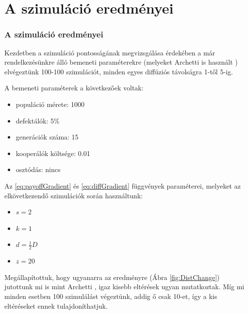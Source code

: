 \section{A szimuláció eredményei}
\begin{frame}
\frametitle{A szimuláció eredményei}
Kezdetben a szimuláció pontosságának megvizsgálása érdekében a már rendelkezésünkre álló bemeneti paraméterekre (melyeket Archetti is használt \cite{archetti2016cooperation}) elvégeztünk 100-100 szimulációt, minden egyes diffúziós távolságra 1-től 5-ig.

\begin{multicols}{2}
	A bemeneti paraméterek a következőek voltak:
	\begin{itemize}
		\item populáció mérete: 1000
		\item defektálók: 5\%
		\item generációk száma: 15
		\item kooperálók költsége: 0.01
		\item osztódás: nincs
	\end{itemize}
	Az \eqref{eq:payoffGradient} és \eqref{eq:diffGradient} függvények paraméterei, melyeket az elkövetkezendő szimulációk során használtunk:
	\begin{itemize}
		\item $s = 2$
		\item $k = 1$
		\item $d = \frac{1}{2}D$
		\item $z = 20$
	\end{itemize}	
\end{multicols}

Megállapítottuk, hogy ugyanarra az eredményre (Ábra \ref{fig:DistChange}) jutottunk mi is mint Archetti \cite{archetti2016cooperation}, igaz kisebb eltérések ugyan mutatkoztak. Míg mi minden esetben 100 szimulálást végeztünk, addig ő csak 10-et, így a kis eltéréseket ennek tulajdoníthatjuk.


\end{frame}
